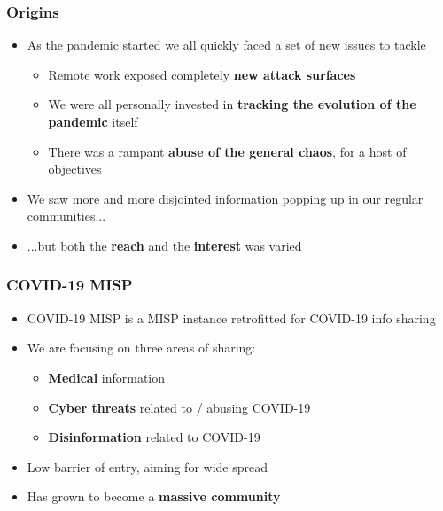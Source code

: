 
\begin{frame}[t,plain]
\titlepage
\end{frame}

\begin{frame}
 \frametitle{Origins}
 \begin{itemize}
         \item As the pandemic started we all quickly faced a set of new issues to tackle
         \begin{itemize}
              \item Remote work exposed completely {\bf new attack surfaces}
              \item We were all personally invested in {\bf tracking the evolution of the pandemic} itself
              \item There was a rampant {\bf abuse of the general chaos}, for a host of objectives
         \end{itemize}
         \item We saw more and more disjointed information popping up in our regular communities...
         \item ...but both the {\bf reach} and the {\bf interest} was varied
 \end{itemize}
\end{frame}

\begin{frame}
 \frametitle{COVID-19 MISP}
 \begin{itemize}
         \item COVID-19 MISP is a MISP instance retrofitted for COVID-19 info sharing
         \item We are focusing on three areas of sharing:
         \begin{itemize}
              \item {\bf Medical} information
              \item {\bf Cyber threats} related to / abusing COVID-19
              \item {\bf Disinformation} related to COVID-19
         \end{itemize}
         \item Low barrier of entry, aiming for wide spread
         \item Has grown to become a {\bf massive community}
 \end{itemize}
\end{frame}

